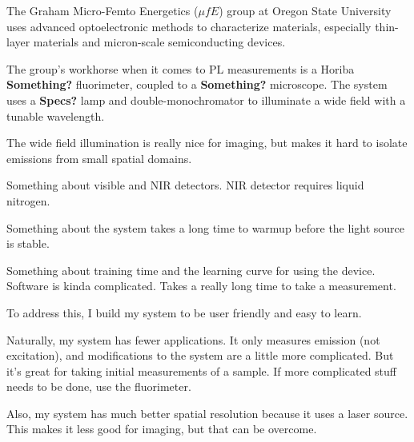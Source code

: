 The Graham Micro-Femto Energetics ($\mu fE$) group at Oregon State University uses advanced optoelectronic methods to characterize materials, especially thin-layer materials and micron-scale semiconducting devices.

The group's workhorse when it comes to PL measurements is a Horiba \textbf{Something?} fluorimeter, coupled to a \textbf{Something?} microscope. The system uses a \textbf{Specs?} lamp and double-monochromator to illuminate a wide field with a tunable wavelength.

The wide field illumination is really nice for imaging, but makes it hard to isolate emissions from small spatial domains.

Something about visible and NIR detectors. NIR detector requires liquid nitrogen.

Something about the system takes a long time to warmup before the light source is stable.

Something about training time and the learning curve for using the device. Software is kinda complicated. Takes a really long time to take a measurement.

To address this, I build my system to be user friendly and easy to learn.

Naturally, my system has fewer applications. It only measures emission (not excitation), and modifications to the system are a little more complicated. But it's great for taking initial measurements of a sample. If more complicated stuff needs to be done, use the fluorimeter.

Also, my system has much better spatial resolution because it uses a laser source. This makes it less good for imaging, but that can be overcome.